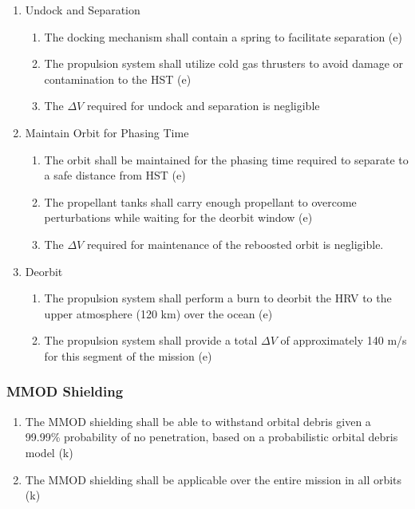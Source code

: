 \documentclass[paper=letter, fontsize=11pt]{scrartcl} %
\numberwithin{equation}{section} %
\numberwithin{figure}{section} %
\numberwithin{table}{section} %
\begin{document}
\begin{enumerate}
\begin{enumerate}
\end{enumerate}
\item Undock and Separation
\begin{enumerate}
	\item The docking mechanism shall contain a spring to facilitate separation (e)
    \item The propulsion system shall utilize cold gas thrusters to avoid damage or contamination to the HST (e)
    \item The $\Delta V$ required for undock and separation is negligible
\end{enumerate}
\item Maintain Orbit for Phasing Time
\begin{enumerate}
    \item The orbit shall be maintained for the phasing time required to separate to a safe distance from HST (e)
    \item The propellant tanks shall carry enough propellant to overcome perturbations while waiting for the deorbit window (e)
    \item The $\Delta V$ required for maintenance of the reboosted orbit is negligible.
\end{enumerate}
\item Deorbit
\begin{enumerate}
    \item The propulsion system shall perform a burn to deorbit the HRV to the upper atmosphere (120 km) over the ocean (e)
    \item The propulsion system shall provide a total $\Delta V$ of approximately 140 m/s for this segment of the mission (e)
\end{enumerate}
\end{enumerate}


\subsubsection{MMOD Shielding}
\begin{enumerate}
\item The MMOD shielding shall be able to withstand orbital debris given a 99.99\% probability of no penetration, based on a probabilistic orbital debris model (k)
\item The MMOD shielding shall be applicable over the entire mission in all orbits (k)
\end{enumerate}
\end{document}
